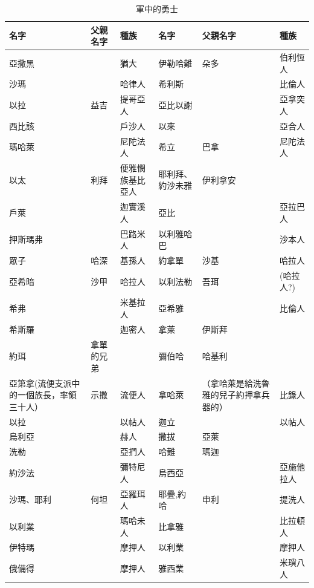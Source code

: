  
\begin{table}[!hbp]
\centering
\begin{tabular}{|p{2cm}|p{2cm}|p{2cm}||p{2cm}|p{2cm}|p{2cm}|}\hline\hline
名字    &父親名字 & 種族 & 名字   &父親名字 & 種族   \\\hline\hline
亞撒黑 &  &  猶大 &伊勒哈難&朵多 &伯利恆人\\\hline  
沙瑪&    & 哈律人 &  希利斯&  &比倫人 \\\hline
以拉&益吉  & 提哥亞人 &  亞比以謝& &亞拿突人\\\hline
 西比該& &戶沙人&以來 & & 亞合人 \\\hline
瑪哈萊 & & 尼陀法人 &  希立&巴拿 &尼陀法人    \\\hline
以太 &利拜 &  便雅憫族基比亞人 &     耶利拜、約沙未雅& 伊利拿安&    \\\hline
戶萊 & &   迦實溪人 &   亞比& & 亞拉巴人\\\hline
押斯瑪弗& &巴路米人& 以利雅哈巴& &沙本人 \\\hline
眾子&哈深 &基孫人& 約拿單&沙基 & 哈拉人\\\hline
亞希暗&沙甲 & 哈拉人& 以利法勒& 吾珥&(哈拉人?) \\\hline
希弗& &米基拉人 & 亞希雅& & 比倫人\\\hline
希斯羅& &迦密人 & 拿萊&伊斯拜 & \\\hline
約珥&拿單的兄弟 & & 彌伯哈&哈基利 & \\\hline
  亞第拿(流便支派中的一個族長，率領三十人）&示撒 &流便人            & 拿哈萊&（拿哈萊是給洗魯雅的兒子約押拿兵器的） & 比錄人\\\hline
以拉& & 以帖人&  迦立& &以帖人 \\\hline
烏利亞& &赫人& 撒拔&亞萊 & \\\hline
洗勒& &亞捫人  &  哈難& 瑪迦& \\\hline
約沙法& &彌特尼人 &烏西亞& &亞施他拉人 \\\hline
沙瑪、耶利& 何坦&亞羅珥人 &耶疊,約哈&申利 &提洗人 \\\hline
以利業& & 瑪哈未人& 比拿雅& &  比拉頓人  \\\hline
伊特瑪& &摩押人& 以利業& &摩押人\\\hline
 俄備得& &摩押人   &雅西業& &米瑣八人 \\\hline
\end{tabular}
\caption{軍中的勇士}
\end{table}
